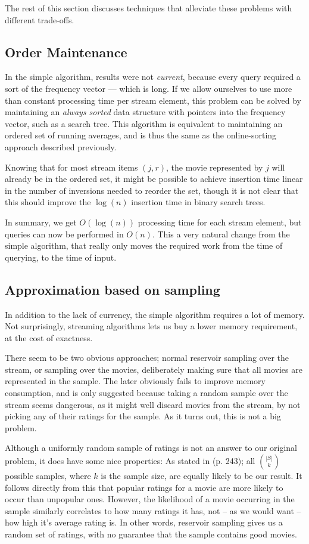 The rest of this section discusses techniques that alleviate these problems
with different trade-offs.

\subsection*{Order Maintenance}
In the simple algorithm, results were not \textit{current}, because every query
required a sort of the frequency vector --- which is long. If we allow ourselves
to use more than constant processing time per stream element, this problem can
be solved by maintaining an \textit{always sorted} data structure with pointers
into the frequency vector, such as a search tree.
This algorithm is equivalent to maintaining an ordered set of running averages,
and is thus the same as the online-sorting approach described previously.

Knowing that for most stream items $(j,r)$, the movie represented by
$j$ will already be in the ordered set, it might be possible to achieve
insertion time linear in the number of inversions needed to reorder the set,
though it is not clear that this should improve the $\log(n)$ insertion time in
binary search trees.

In summary, we get $O(\log(n))$ processing time for each stream element, but
queries can now be performed in $O(n)$. This a very natural change from the
simple algorithm, that really only moves the required work from the time of
querying, to the time of input.

\subsection*{Approximation based on sampling}
In addition to the lack of currency, the simple algorithm requires a lot of
memory. Not surprisingly, streaming algorithms lets us buy a lower memory
requirement, at the cost of exactness.

There seem to be two obvious approaches;
normal reservoir sampling over the stream, or sampling over the
movies, deliberately making sure that all movies are represented in the sample.
The later obviously fails to improve memory consumption, and is only suggested
because taking a random sample over the stream seems dangerous, as it might well
discard movies from the stream, by not picking any of their ratings for the
sample. As it turns out, this is not a big problem.

Although a uniformly random sample of ratings is not an answer to our original
problem, it does have some nice properties: As stated in
 (p. 243); all $|S| \choose k$ possible
samples, where $k$ is the sample size, are equally likely to be our result. It
follows directly from this that popular ratings for a movie are more likely to
occur than unpopular ones. However, the likelihood of a movie occurring in the
sample similarly correlates to how many ratings it has, not -- as we would want
-- how high it's average rating is. In other words, reservoir sampling gives us
a random set of ratings, with no guarantee that the sample contains good movies.

